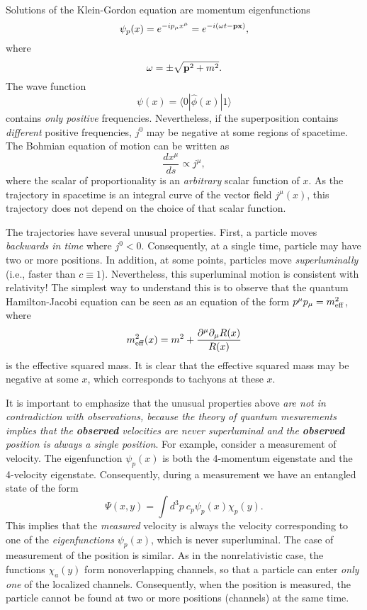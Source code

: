 \documentclass[12pt]{article} %
\begin{document}
Solutions of the Klein-Gordon equation are momentum eigenfunctions
\begin{equation}
\psi_{p}(x)=e^{-ip_{\mu}x^{\mu}}=e^{-i(\omega t-{\bf p}{\bf x})} ,
\end{equation}
where
\begin{equation}
\omega=\pm\sqrt{{\bf p}^2+m^2} .
\end{equation}
The wave function 
\begin{equation}
\psi(x)=\langle 0|\hat{\phi}(x)|1\rangle
\end{equation}
contains {\em only positive} frequencies. Nevertheless, 
if the superposition contains {\em different} positive frequencies,
$j^0$ may be negative at some regions of spacetime.
The Bohmian equation of motion can be written as 
\begin{equation}
\frac{dx^{\mu}}{ds} \propto j^{\mu} ,
\end{equation}
where the scalar of proportionality is an {\em arbitrary} 
scalar function of $x$. As the trajectory in spacetime is an 
integral curve of the vector field $j^{\mu}(x)$, this trajectory 
does not depend on the choice of that scalar function. 

The trajectories have several 
unusual properties. First, 
a particle moves {\em backwards in time} where $j^0<0$. 
Consequently, at a single time, particle may have two or more positions. 
In addition, at some points, particles move {\em superluminally}
(i.e., faster than $c\equiv 1$).
Nevertheless, this superluminal motion is consistent with 
relativity! The simplest way to understand this is to observe 
that the quantum Hamilton-Jacobi equation can be seen as an
equation of the form $p^{\mu}p_{\mu}=m^2_{\rm eff}$, where 
\begin{equation}
m^2_{\rm eff}(x)=m^2+
\frac{\partial^{\mu}\partial_{\mu} R(x)}{R(x)} 
\end{equation}
is the effective squared mass. It is clear that the effective
squared mass may be negative at some $x$, which corresponds to tachyons
at these $x$.

It is important to emphasize that the unusual properties above 
{\em are not in contradiction with observations, 
because the theory of quantum mesurements implies that the {\bf observed} 
velocities are never superluminal and the {\bf observed} position is 
always a single position}. 
For example, consider a measurement of velocity. The eigenfunction 
$\psi_{p}(x)$ is both the 4-momentum eigenstate and the
4-velocity eigenstate. Consequently, during a measurement we have 
an entangled state of the form
\begin{equation}
\Psi(x,y)=\int d^3p\: c_p\psi_p(x)\chi_p(y) .
\end{equation}
This implies that the {\em measured} velocity is always the velocity 
corresponding to one of the {\em eigenfunctions} $\psi_p(x)$, 
which is never superluminal. 
The case of measurement of the position is similar. As in the 
nonrelativistic case, the functions $\chi_a(y)$ form nonoverlapping
channels, so that a 
particle can enter {\em only one} of the localized channels. Consequently, 
when the position is measured, the particle cannot be found at two 
or more positions (channels) at the same time. 
\end{document}
